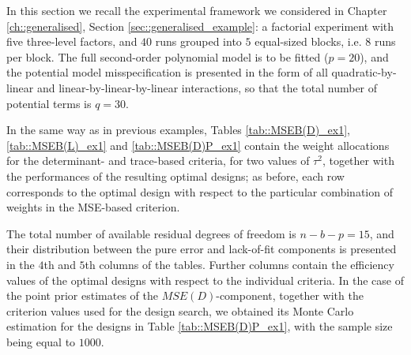 In this section we recall the experimental framework we considered in Chapter \ref{ch::generalised}, Section \ref{sec::generalised_example}: a factorial experiment with five three-level factors, and $40$ runs grouped into $5$ equal-sized blocks, i.e. $8$ runs per block. The full second-order polynomial model is to be fitted ($p=20$), and the potential model misspecification is presented in the form of all quadratic-by-linear and linear-by-linear-by-linear interactions, so that the total number of potential terms is $q=30$.  

In the same way as in previous examples, Tables \ref{tab::MSEB(D)_ex1}, \ref{tab::MSEB(L)_ex1} and \ref{tab::MSEB(D)P_ex1} contain the weight allocations for the determinant- and trace-based criteria, for two values of $\tau^2$, together with the performances of the resulting optimal designs; as before, each row corresponds to the optimal design with respect to the particular combination of weights in the MSE-based criterion.

The total number of available residual degrees of freedom is $n-b-p=15$, and their distribution between the pure error and lack-of-fit components is presented in the $4$th and $5$th columns of the tables. Further columns contain the efficiency values of the optimal designs with respect to the individual criteria. In the case of the point prior estimates of the $MSE(D)$-component, together with the criterion values used for the design search, we obtained its Monte Carlo estimation for the designs in Table \ref{tab::MSEB(D)P_ex1}, with the sample size being equal to $1000$.  


